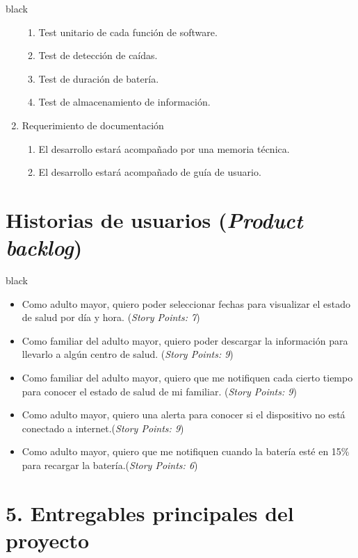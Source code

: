 \documentclass[11pt]{charter}
\begin{document}
\begin{consigna}{black}
\begin{enumerate}
	\begin{enumerate}
	\item Test unitario de cada función de software.
	\item Test de detección de caídas.
	\item Test de duración de batería.
	\item Test de almacenamiento de información.
	\end{enumerate}
\item Requerimiento de documentación
	\begin{enumerate}
	\item El desarrollo estará acompañado por una memoria técnica.
	\item El desarrollo estará acompañado de guía de usuario.
	\end{enumerate}

\end{enumerate}
\end{consigna}
\vspace{-15px}
\section{Historias de usuarios (\textit{Product backlog})}
\label{sec:backlog}

\begin{consigna}{black}
\vspace{-35px}
\begin{itemize}
\item Como adulto mayor, quiero poder seleccionar fechas para visualizar el estado de salud por día y hora. (\textit{Story Points: 7})
\item Como familiar del adulto mayor, quiero poder descargar la información para llevarlo a algún centro de salud. (\textit{Story Points: 9}) 
\item Como familiar del adulto mayor, quiero que me notifiquen cada cierto tiempo para conocer el estado de salud de mi familiar. (\textit{Story Points: 9}) 
\item Como adulto mayor, quiero una alerta para conocer si el dispositivo no está conectado a internet.(\textit{Story Points: 9})  
\item Como adulto mayor, quiero que me notifiquen cuando la batería esté en 15\% para recargar la batería.(\textit{Story Points: 6}) 
\end{itemize}
\end{consigna}
\vspace{-15px}
\section{5. Entregables principales del proyecto}
\label{sec:entregables}
\end{document}
